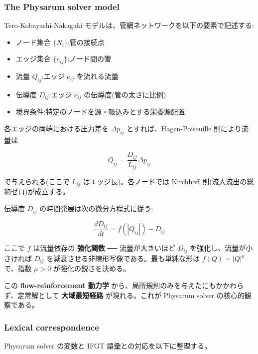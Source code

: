 \subsubsection{The Physarum solver model}


Tero-Kobayashi-Nakagaki モデルは、管網ネットワークを以下の要素で記述する:

\begin{itemize}
\item ノード集合 $\{N_i\}$:管の接続点
\item エッジ集合 $\{e_{ij}\}$:ノード間の管
\item 流量 $Q_{ij}$:エッジ $e_{ij}$ を流れる流量
\item 伝導度 $D_{ij}$:エッジ $e_{ij}$ の伝導度(管の太さに比例)
\item 境界条件:特定のノードを源・吸込みとする栄養源配置
\end{itemize}

各エッジの両端における圧力差を $\Delta p_{ij}$ とすれば、Hagen-Poiseuille 則により流量は

\[
Q_{ij} = \frac{D_{ij}}{L_{ij}} \Delta p_{ij}
\]

で与えられる(ここで $L_{ij}$ はエッジ長)。各ノードでは Kirchhoff 則(流入流出の総和ゼロ)が成立する。

伝導度 $D_{ij}$ の時間発展は次の微分方程式に従う:

\[
\frac{dD_{ij}}{dt} = f(|Q_{ij}|) - D_{ij}
\]

ここで $f$ は流量依存の \textbf{強化関数} ── 流量が大きいほど $D_{ij}$ を強化し、流量が小さければ $D_{ij}$ を減衰させる非線形写像である。最も単純な形は $f(Q) = |Q|^{\mu}$ で、指数 $\mu > 0$ が強化の鋭さを決める。

この \textbf{flow-reinforcement 動力学} から、局所規則のみを与えたにもかかわらず、定常解として \textbf{大域最短経路} が現れる。これが Physarum solver の核心的観察である。

\subsubsection{Lexical correspondence}


Physarum solver の変数と IFGT 語彙との対応を以下に整理する。

